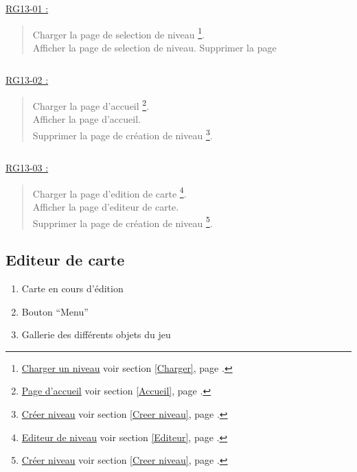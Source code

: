 \documentclass{report}
\begin{document}
			\underline{RG13-01 :}
				\begin{quote}
					Charger la page de selection de niveau%
						\footnote[1]{
							\hyperlink{Charger un niveau}{Charger un niveau}
							\og voir section \ref{Charger}, page \pageref{Charger}.\fg
						}.\\
					Afficher la page de selection de niveau\footnotemark[1].
					Supprimer la page
				\end{quote}
				
			$\,$

			\underline{RG13-02 :}
				\begin{quote}
					Charger la page d'accueil%
						\footnote[2]{
							\hyperlink{Page d'accueil}{Page d'accueil}
							\og voir section \ref{Accueil}, page \pageref{Accueil}.\fg
						}.\\
					Afficher la page d'accueil\footnotemark[2].\\
					Supprimer la page de création de niveau%
					\footnote[3]{
						\hyperlink{Creer niveau}{Créer niveau}
						\og voir section \ref{Creer niveau}, page \pageref{Creer niveau}.\fg
					}.
				\end{quote}
				
			$\,$
			
			\underline{RG13-03 :}
				\begin{quote}
					Charger la page d'edition de carte%
					\footnote[2]{
							\hyperlink{Editeur}{Editeur de niveau}
							\og voir section \ref{Editeur}, page \pageref{Editeur}.\fg
						}.\\
					Afficher la page d'editeur de carte\footnotemark[2].\\
					Supprimer la page de création de niveau%
					\footnote[3]{
						\hyperlink{Creer niveau}{Créer niveau}
						\og voir section \ref{Creer niveau}, page \pageref{Creer niveau}.\fg
					}.
				\end{quote}
				
				
\newpage

	\subsection{Editeur de carte}
		
		\hypertarget{Editeur de carte}{}
		\label{Editeur de carte}
			
		\begin{center}
			
		\end{center}
		
		\begin{enumerate}
		  \item Carte en cours d'édition
		  \item Bouton ``Menu''
		  \item Gallerie des différents objets du jeu
		\end{enumerate}
\end{document}
